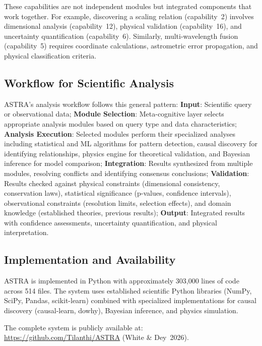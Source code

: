 \documentclass[usenatbib]{rasti}
\begin{document}
These capabilities are not independent modules but integrated components that work together. For example, discovering a scaling relation (capability~2) involves dimensional analysis (capability~12), physical validation (capability~16), and uncertainty quantification (capability~6). Similarly, multi-wavelength fusion (capability~5) requires coordinate calculations, astrometric error propagation, and physical classification criteria.

\subsection{Workflow for Scientific Analysis}

ASTRA's analysis workflow follows this general pattern: \textbf{Input}: Scientific query or observational data; \textbf{Module Selection}: Meta-cognitive layer selects appropriate analysis modules based on query type and data characteristics; \textbf{Analysis Execution}: Selected modules perform their specialized analyses including statistical and ML algorithms for pattern detection, causal discovery for identifying relationships, physics engine for theoretical validation, and Bayesian inference for model comparison; \textbf{Integration}: Results synthesized from multiple modules, resolving conflicts and identifying consensus conclusions; \textbf{Validation}: Results checked against physical constraints (dimensional consistency, conservation laws), statistical significance (p-values, confidence intervals), observational constraints (resolution limits, selection effects), and domain knowledge (established theories, previous results); \textbf{Output}: Integrated results with confidence assessments, uncertainty quantification, and physical interpretation.

\subsection{Implementation and Availability}

ASTRA is implemented in Python with approximately 303,000 lines of code across 514 files. The system uses established scientific Python libraries (NumPy, SciPy, Pandas, scikit-learn) combined with specialized implementations for causal discovery (causal-learn, dowhy), Bayesian inference, and physics simulation.

The complete system is publicly available at: \url{https://github.com/Tilanthi/ASTRA} (White \& Dey~2026)\cite{astra_github}.
\end{document}
